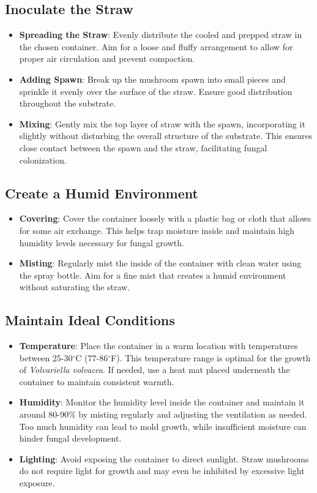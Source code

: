 \subsection{Inoculate the Straw}
\begin{itemize}
    \item \textbf{Spreading the Straw}: Evenly distribute the cooled and prepped straw in the chosen container. Aim for a loose and fluffy arrangement to allow for proper air circulation and prevent compaction.
    \item \textbf{Adding Spawn}: Break up the mushroom spawn into small pieces and sprinkle it evenly over the surface of the straw. Ensure good distribution throughout the substrate.
    \item \textbf{Mixing}: Gently mix the top layer of straw with the spawn, incorporating it slightly without disturbing the overall structure of the substrate. This ensures close contact between the spawn and the straw, facilitating fungal colonization.
\end{itemize}
\subsection{Create a Humid Environment}
\begin{itemize}
    \item \textbf{Covering}: Cover the container loosely with a plastic bag or cloth that allows for some air exchange. This helps trap moisture inside and maintain high humidity levels necessary for fungal growth.
    \item \textbf{Misting}: Regularly mist the inside of the container with clean water using the spray bottle. Aim for a fine mist that creates a humid environment without saturating the straw.
\end{itemize}
\subsection{Maintain Ideal Conditions}
\begin{itemize}
    \item \textbf{Temperature}: Place the container in a warm location with temperatures between 25-30$^\circ$C (77-86$^\circ$F). This temperature range is optimal for the growth of \textit{Volvariella volvacea}. If needed, use a heat mat placed underneath the container to maintain consistent warmth.
    \item \textbf{Humidity}: Monitor the humidity level inside the container and maintain it around 80-90\% by misting regularly and adjusting the ventilation as needed. Too much humidity can lead to mold growth, while insufficient moisture can hinder fungal development.
    \item \textbf{Lighting}: Avoid exposing the container to direct sunlight. Straw mushrooms do not require light for growth and may even be inhibited by excessive light exposure.
\end{itemize}
